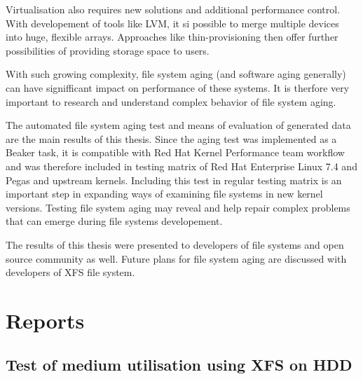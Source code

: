 \documentclass[
  color, %
  table, %
  lof,   %
  lot,   %
]{fithesis3}
\begin{document}

Virtualisation also requires new solutions and additional performance control. With developement of tools like LVM, it si possible to merge multiple devices into huge, flexible arrays. Approaches like thin-provisioning then offer further possibilities of providing storage space to users. 

With such growing complexity, file system aging (and software aging generally) can have signifficant impact on performance of these systems. It is therfore very important to research and understand complex behavior of file system aging.

The automated file system aging test and means of evaluation of generated data are the main results of this thesis. Since the aging test was implemented as a Beaker task, it is compatible with Red Hat Kernel Performance team workflow and was therefore included in testing matrix of Red Hat Enterprise Linux 7.4 and Pegas and upstream kernels. Including this test in regular testing matrix is an important step in expanding ways of examining file systems in new kernel versions. Testing file system aging may reveal and help repair complex problems that can emerge during file systems developement.

The results of this thesis were presented to developers of file systems and open source community as well. Future plans for file system aging are discussed with developers of XFS file system.



















\printbibliography[heading=bibintoc]

\appendix %
\chapter{Reports}\label{reports}



\section{Test of medium utilisation using XFS on HDD}
\end{document}
